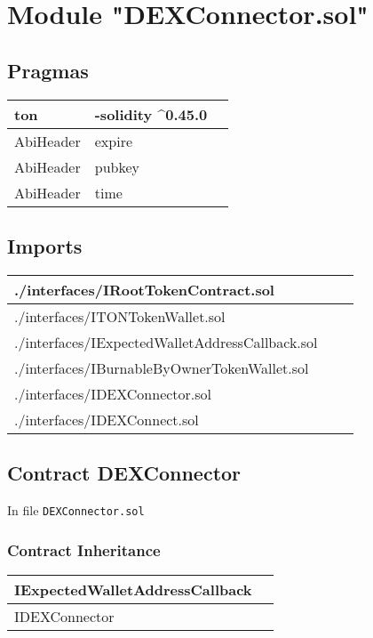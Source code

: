 
\section{Module "DEXConnector.sol"}


\subsection{Pragmas}


\noindent\begin{tabular}{|l|l|p{5cm}|}\hline
ton & -solidity \^{}0.45.0 &\\\hline
AbiHeader &  expire &\\\hline
AbiHeader &  pubkey &\\\hline
AbiHeader &  time &\\\hline
\end{tabular}


\subsection{Imports}


\noindent\begin{tabular}{|l|l|p{5cm}|}\hline
./interfaces/IRootTokenContract.sol &\\\hline
./interfaces/ITONTokenWallet.sol &\\\hline
./interfaces/IExpectedWalletAddressCallback.sol &\\\hline
./interfaces/IBurnableByOwnerTokenWallet.sol &\\\hline
./interfaces/IDEXConnector.sol &\\\hline
./interfaces/IDEXConnect.sol &\\\hline
\end{tabular}


\subsection{Contract DEXConnector}


In file {\tt DEXConnector.sol}

\subsubsection{Contract Inheritance}


\noindent\begin{tabular}{|l|p{5cm}|}\hline
IExpectedWalletAddressCallback & \\\hline
IDEXConnector & \\\hline
\end{tabular}


